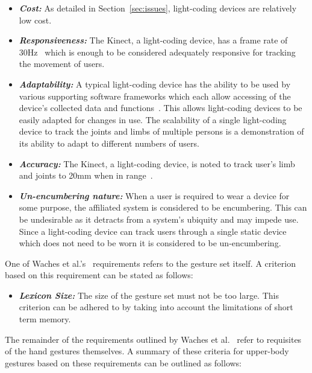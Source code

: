 \documentclass[link]{IWCOMP}
\begin{document}
\begin{itemize}
\item  \textit{\textbf{Cost:}} As detailed in Section~\ref{sec:issues}, light-coding devices are relatively low cost.
\item \textit{\textbf{Responsiveness:}} The Kinect, a light-coding device, has a frame rate of 30Hz~\cite{Livingston2012} which is enough to be considered adequately responsive for tracking the movement of users.
\item \textit{\textbf{Adaptability:}} A typical light-coding device has the ability to be used by various supporting software frameworks which each allow accessing of the device's collected data and functions~\cite{Goth2011}.
This allows light-coding devices to be easily adapted for changes in use.
The scalability of a single light-coding device to track the joints and limbs of multiple persons is a demonstration of its ability to adapt to different numbers of users.
\item \textit{\textbf{Accuracy:}} The Kinect, a light-coding device, is noted to track user's limb and joints to 20mm when in range~\cite{Marquardt2011}.
\item \textit{\textbf{Un-encumbering nature:}} When a user is required to wear a device for some purpose, the affiliated system is considered to be encumbering.
This can be undesirable as it detracts from a system's ubiquity and may impede use. 
Since a light-coding device can track users through a single static device which does not need to be worn it is considered to be un-encumbering.\\ 
\end{itemize}

One of Waches et al.'s~\citeyearpar{Wachs2011} requirements refers to the gesture set itself.
A criterion based on this requirement can be stated as follows:

\begin{itemize}
\item \textit{\textbf{Lexicon Size:}} The size of the gesture set must not be too large.
This criterion can be adhered to by taking into account the limitations of short term memory.\\ 
\end{itemize}

The remainder of the requirements outlined by Waches et al.~\citeyearpar{Wachs2011} refer to requisites of the hand gestures themselves.
A summary of these criteria for upper-body gestures based on these requirements can be outlined as follows:
\end{document}
